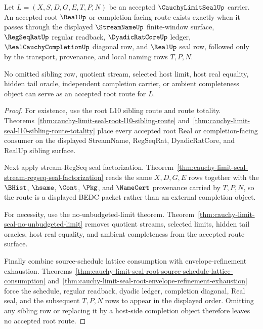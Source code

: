 \begin{theorem}
\label{thm:cauchy-limit-seal-root-sibling-route-exactness}
Let $L=(X,S,D,G,E,T,P,N)$ be an accepted $\CauchyLimitSealUp$ carrier. An accepted root $\RealUp$ or completion-facing route exists exactly when it passes through the displayed $\StreamNameUp$ finite-window surface, $\RegSeqRatUp$ regular readback, $\DyadicRatCoreUp$ ledger, $\RealCauchyCompletionUp$ diagonal row, and $\RealUp$ seal row, followed only by the transport, provenance, and local naming rows $T,P,N$.

No omitted sibling row, quotient stream, selected host limit, host real equality, hidden tail oracle, independent completion carrier, or ambient completeness object can serve as an accepted root route for $L$.
\end{theorem}
\begin{proof}
For existence, use the root L10 sibling route and route totality. Theorems~\ref{thm:cauchy-limit-seal-root-l10-sibling-route} and~\ref{thm:cauchy-limit-seal-l10-sibling-route-totality} place every accepted root Real or completion-facing consumer on the displayed StreamName, RegSeqRat, DyadicRatCore, and RealUp sibling surface.

Next apply stream-RegSeq seal factorization. Theorem~\ref{thm:cauchy-limit-seal-stream-regseq-seal-factorization} reads the same $X,D,G,E$ rows together with the $\BHist$, $\hsame$, $\Cont$, $\Pkg$, and $\NameCert$ provenance carried by $T,P,N$, so the route is a displayed BEDC packet rather than an external completion object.

For necessity, use the no-unbudgeted-limit theorem. Theorem~\ref{thm:cauchy-limit-seal-no-unbudgeted-limit} removes quotient streams, selected limits, hidden tail oracles, host real equality, and ambient completeness from the accepted route surface.

Finally combine source-schedule lattice consumption with envelope-refinement exhaustion. Theorems~\ref{thm:cauchy-limit-seal-root-source-schedule-lattice-consumption} and~\ref{thm:cauchy-limit-seal-root-envelope-refinement-exhaustion} force the schedule, regular readback, dyadic ledger, completion diagonal, Real seal, and the subsequent $T,P,N$ rows to appear in the displayed order. Omitting any sibling row or replacing it by a host-side completion object therefore leaves no accepted root route.
\end{proof}


